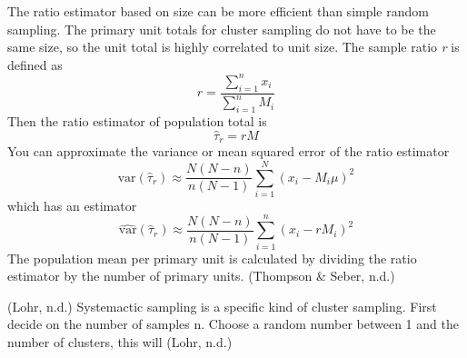 \documentclass[12pt,twoside]{reedthesis}
\begin{document}
The ratio estimator based on size can be more efficient than simple random sampling. The primary unit totals for cluster sampling do not have to be the same size, so the unit total is highly correlated to unit size. The sample ratio \emph{r} is defined as
\[
r = \frac{\sum_{i=1}^n x_i}{\sum_{i=1}^n M_i}
\]
Then the ratio estimator of population total is
\[
\widehat{\tau}_r = rM
\]
You can approximate the variance or mean squared error of the ratio estimator
\[
\text{var} \left( \hat{\tau}_r \right) \approx \frac{N(N-n)}{n(N-1)} \sum_{i=1}^N
\left( x_i - M_i\mu \right)^2 
\]
which has an estimator
\[
\widehat{\text{var}} \left( \hat{\tau}_r \right) \approx \frac{N(N-n)}{n(N-1)} \sum_{i=1}^n
\left( x_i - rM_i\right)^2 
\]
The population mean per primary unit is calculated by dividing the ratio estimator by the number of primary units. (Thompson \& Seber, n.d.)

(Lohr, n.d.) Systemactic sampling is a specific kind of cluster sampling. First decide on the number of samples n. Choose a random number between 1 and the number of clusters, this will (Lohr, n.d.)
\end{document}
